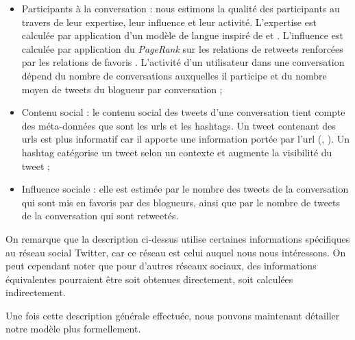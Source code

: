 \documentclass{article-hermes}
\begin{document}
\begin{itemize}
\item Participants à la conversation : nous estimons la qualité des participants au travers de leur expertise, leur influence et leur activité. L'expertise est calculée par application d'un modèle de langue inspiré de \cite{bal} et \cite{lamjedmarami}. L'influence est calculée par application du \textit{PageRank} sur les relations de retweets renforcées par les relations de favoris \cite{lamjedmarami}. L'activité d'un utilisateur dans une conversation dépend du nombre de conversations auxquelles il participe et du nombre moyen de tweets du blogueur par conversation ;

\item Contenu social : le contenu social des tweets d'une conversation tient compte des méta-données que sont les urls et les hashtags. Un tweet contenant des urls est plus informatif car il apporte une information portée par l'url (\cite{Nagmoti}, \cite{Zhao}). Un hashtag catégorise un tweet selon un contexte et augmente la visibilité du tweet \cite{Duan} ;
\item Influence sociale : elle est estimée par le nombre des tweets de la conversation qui sont mis en favoris par des blogueurs, ainsi que par le nombre de tweets de la conversation qui sont retweetés.
\end{itemize}

On remarque que la description ci-dessus utilise certaines informations spécifiques au réseau social Twitter, car ce réseau est celui auquel nous nous intéressons. On peut cependant noter que pour d'autres réseaux sociaux, des informations équivalentes pourraient être soit obtenues directement, soit calculées indirectement. 

Une fois cette description générale effectuée, nous pouvons maintenant détailler notre modèle plus formellement.
\end{document}
